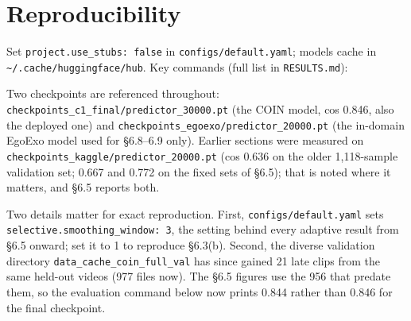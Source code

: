 \medskip

\appendix
\section{Reproducibility}

Set \texttt{project.use\_stubs: false} in \texttt{configs/default.yaml}; models cache in \texttt{\textasciitilde{}/.cache/huggingface/hub}. Key commands (full list in \texttt{RESULTS.md}):

Two checkpoints are referenced throughout: \texttt{checkpoints\_c1\_final/predictor\_30000.pt} (the COIN model, cos 0.846, also the deployed one) and \texttt{checkpoints\_egoexo/predictor\_20000.pt} (the in-domain EgoExo model used for \S6.8--6.9 only). Earlier sections were measured on \texttt{checkpoints\_kaggle/predictor\_20000.pt} (cos 0.636 on the older 1,118-sample validation set; 0.667 and 0.772 on the fixed sets of \S6.5); that is noted where it matters, and \S6.5 reports both.

Two details matter for exact reproduction. First, \texttt{configs/default.yaml} sets \texttt{selective.smoothing\_window: 3}, the setting behind every adaptive result from \S6.5 onward; set it to 1 to reproduce \S6.3(b). Second, the diverse validation directory \texttt{data\_cache\_coin\_full\_val} has since gained 21 late clips from the same held-out videos (977 files now). The \S6.5 figures use the 956 that predate them, so the evaluation command below now prints 0.844 rather than 0.846 for the final checkpoint.

